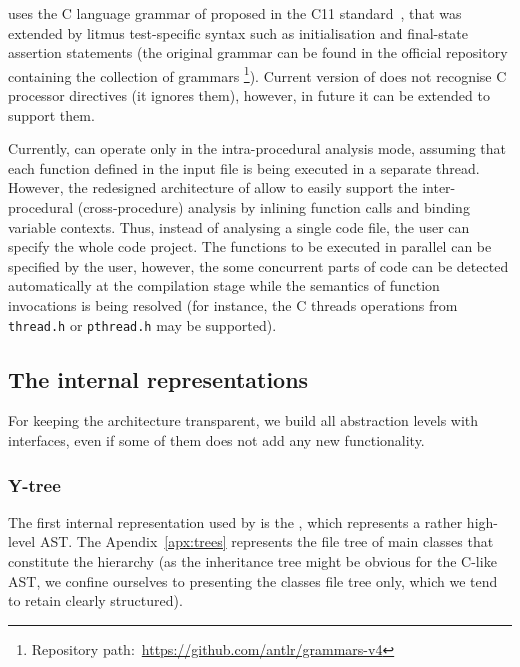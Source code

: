 \porthos[2] uses the C language grammar of proposed in the C11 standard~\cite{jtc2011sc22}, that was extended by litmus test-specific syntax such as initialisation and final-state assertion statements (the original  grammar can be found in the official repository containing the collection of  grammars%
%
\footnote{Repository path:~\url{https://github.com/antlr/grammars-v4}}). %
%
Current version of \porthos[2] does not recognise C processor directives (it ignores them), however, in future it can be extended to support them.

Currently, \porthos[2] can operate only in the intra-procedural analysis mode, assuming that each function defined in the input file is being executed in a separate thread.
However, the redesigned architecture of \porthos[2] allow to easily support the inter-procedural (cross-procedure) analysis by inlining function calls and binding variable contexts.
Thus, instead of analysing a single code file, the user can specify the whole code project.
The functions to be executed in parallel can be specified by the user, however, the some concurrent parts of code can be detected automatically at the compilation stage while the semantics of function invocations is being resolved (for instance, the C threads operations from \texttt{thread.h} or \texttt{pthread.h} may be supported).



\subsection{The internal representations}
\label{ch:impl:model}

For keeping the architecture transparent, we build all abstraction levels with interfaces, even if some of them does not add any new functionality.%

\subsubsection{Y-tree}
\label{ch:impl:model:ytree}

The first internal representation used by \porthos[2] is the \textit{\ytree{}}, which represents a rather high-level AST.
The Apendix~\ref{apx:trees} represents the file tree of main classes that constitute the \ytree{} hierarchy (as the inheritance tree might be obvious for the C-like AST, we confine ourselves to presenting the classes file tree only, which we tend to retain clearly structured).

